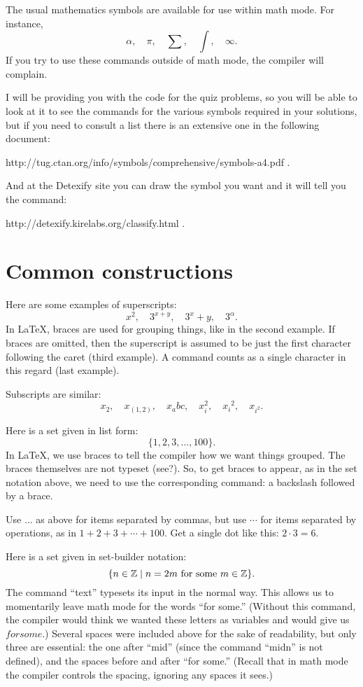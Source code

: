 \documentclass{article}
\begin{document}
The usual mathematics symbols are available for use within math mode.  For instance,
\[
\alpha, \quad \pi, \quad \sum, \quad \int, \quad \infty.
\]
If you try to use these commands outside of math mode, the compiler will complain.

I will be providing you with the code for the quiz problems, so you will be able to look at it to see the commands for the various
symbols required in your solutions, but if you need to consult a list there is an extensive one in the following document:

http://tug.ctan.org/info/symbols/comprehensive/symbols-a4.pdf .

And at the Detexify site you can draw the symbol you want and it will tell you the command:

http://detexify.kirelabs.org/classify.html .

\section{Common constructions}

Here are some examples of superscripts:
\[
x^2, \quad 3^{x+y}, \quad 3^x+y, \quad 3^\alpha .
\]
In \LaTeX, braces are used for grouping things, like in the second example.  If braces are omitted, then the superscript is assumed
to be just the first character following the caret (third example).  A command counts as a single character in this regard (last
example).

Subscripts are similar:
\[
x_2, \quad x_{(1,2)}, \quad x_abc, \quad x_i^2, \quad {x_i}^2, \quad x_{i^2}.
\]

Here is a set given in list form:
\[
\{1,2,3,\dots,100\}.
\]
In \LaTeX, we use braces to tell the compiler how we want things grouped.  The braces themselves are not typeset {{{(see?)}}}.  So,
to get braces to appear, as in the set notation above, we need to use the corresponding command:  a backslash followed by
a brace.

Use \(\dots\) as above for items separated by commas, but use \(\cdots\) for items separated by operations, as in
\(1+2+3+\cdots+100\).  Get a single dot like this: \(2\cdot3=6\).

Here is a set given in set-builder notation:
\[
\{ n\in{\mathbb{Z}} \mid n=2m \text{ for some } m\in{\mathbb{Z}} \}.
\]
The command ``text'' typesets its input in the normal way.  This allows us to momentarily leave math mode for the words ``for
some.'' (Without this command, the compiler would think we wanted these letters as variables and would give us \(for some\).)
Several spaces were included above for the sake of readability, but only three are essential: the one after ``mid'' (since the
command ``midn'' is not defined), and the spaces before and after ``for some.''  (Recall that in math mode the compiler controls
the spacing, ignoring any spaces it sees.)
\end{document}
